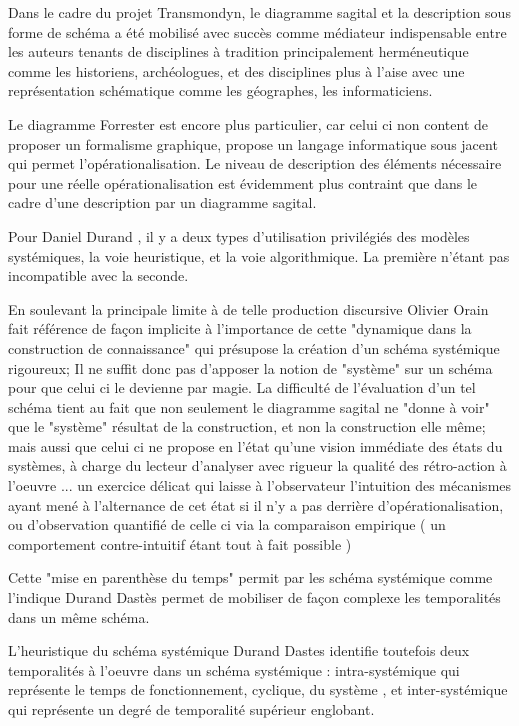 {Dans le cadre du projet Transmondyn, le diagramme sagital et la description sous forme de schéma a été mobilisé avec succès comme médiateur indispensable entre les auteurs tenants de disciplines à tradition principalement herméneutique comme les historiens, archéologues, et des disciplines plus à l'aise avec une représentation schématique comme les géographes, les informaticiens.

Le diagramme Forrester est encore plus particulier, car celui ci non content de proposer un formalisme graphique, propose un langage informatique sous jacent qui permet l'opérationalisation. Le niveau de description des éléments nécessaire pour une réelle opérationalisation est évidemment plus contraint que dans le cadre d'une description par un diagramme sagital.

Pour Daniel Durand \autocite{Orain2001}, il y a deux types d'utilisation privilégiés des modèles systémiques, la voie heuristique, et la voie algorithmique. La première n'étant pas incompatible avec la seconde. 

En soulevant la principale limite à de telle production discursive Olivier Orain \autocite[47]{Orain2001}  fait référence de façon implicite à l'importance de cette "dynamique dans la construction de connaissance" qui présupose la création d'un schéma systémique rigoureux; Il ne suffit donc pas d'apposer la notion de "système" sur un schéma pour que celui ci le devienne par magie. La difficulté de l'évaluation d'un tel schéma tient au fait que non seulement le diagramme sagital ne "donne à voir" que le "système" résultat de la construction, et non la construction elle même; mais aussi que celui ci ne propose en l'état qu'une vision immédiate des états du systèmes, à charge du lecteur d'analyser avec rigueur la qualité des rétro-action à l'oeuvre ... un exercice délicat qui laisse à l'observateur l'intuition des mécanismes ayant mené à l'alternance de cet état si il n'y a pas derrière d'opérationalisation, ou d'observation quantifié de celle ci via la comparaison empirique ( un comportement contre-intuitif étant tout à fait possible )

Cette "mise en parenthèse du temps" permit par les schéma systémique comme l'indique Durand Dastès permet de mobiliser de façon complexe les temporalités dans un même schéma. 

L'heuristique du schéma systémique Durand Dastes identifie toutefois deux temporalités à l'oeuvre dans un schéma systémique : intra-systémique qui représente le temps de fonctionnement, cyclique, du système , et inter-systémique qui représente un degré de temporalité supérieur englobant. 

}
